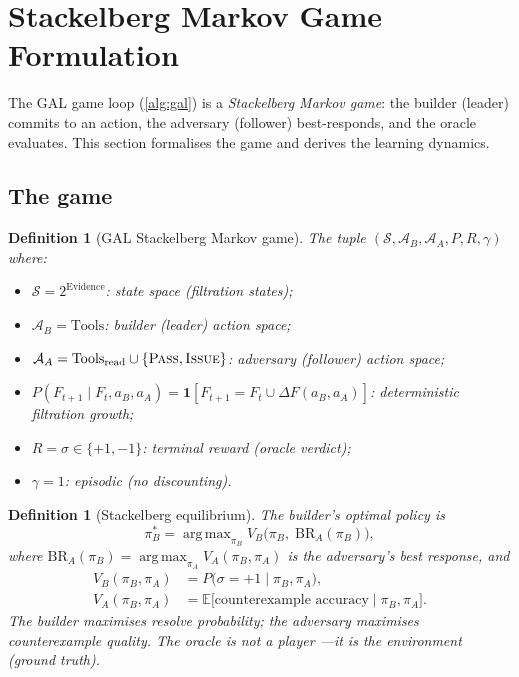 \documentclass{article}
\newtheorem{definition}[theorem]{Definition}
\DeclareMathOperator*{\argmax}{arg\,max}
\newcommand{\E}{\mathbb{E}}
\newcommand{\calA}{\mathcal{A}}
\newcommand{\calS}{\mathcal{S}}
\begin{document}
\section{Stackelberg Markov Game Formulation}\label{sec:stackelberg}

The GAL game loop (\cref{alg:gal}) is a \emph{Stackelberg
Markov game}: the builder (leader) commits to an action, the
adversary (follower) best-responds, and the oracle evaluates.
This section formalises the game and derives the learning
dynamics.

\subsection{The game}

\begin{definition}[GAL Stackelberg Markov game]%
\label{def:stackelberg-game}
The tuple $(\calS, \calA_B, \calA_A, P, R, \gamma)$ where:
\begin{itemize}[nosep]
  \item $\calS = 2^{\mathrm{Evidence}}$: state space
    (filtration states);
  \item $\calA_B = \mathrm{Tools}$: builder (leader) action
    space;
  \item $\calA_A = \mathrm{Tools}_{\mathrm{read}} \cup
    \{\textsc{Pass}, \textsc{Issue}\}$: adversary (follower)
    action space;
  \item $P(F_{t+1} \mid F_t, a_B, a_A) =
    \mathbf{1}[F_{t+1} = F_t \cup \Delta F(a_B, a_A)]$:
    deterministic filtration growth;
  \item $R = \sigma \in \{+1, -1\}$: terminal reward
    (oracle verdict);
  \item $\gamma = 1$: episodic (no discounting).
\end{itemize}
\end{definition}

\begin{definition}[Stackelberg equilibrium]%
\label{def:stackelberg-eq}
The builder's optimal policy is
\begin{equation}\label{eq:stackelberg-eq}
  \pi_B^* = \argmax_{\pi_B}
  V_B\bigl(\pi_B,\; \mathrm{BR}_A(\pi_B)\bigr),
\end{equation}
where $\mathrm{BR}_A(\pi_B)
= \argmax_{\pi_A} V_A(\pi_B, \pi_A)$ is the adversary's
best response, and
\begin{align}
  V_B(\pi_B, \pi_A)
  &= P\bigl(\sigma = +1 \mid \pi_B, \pi_A\bigr),
  \label{eq:V-builder} \\
  V_A(\pi_B, \pi_A)
  &= \E\bigl[\text{counterexample accuracy} \mid
    \pi_B, \pi_A\bigr].
  \label{eq:V-adversary}
\end{align}
The builder maximises resolve probability; the adversary
maximises counterexample quality.  The oracle is not a player
---it is the environment (ground truth).
\end{definition}
\end{document}
